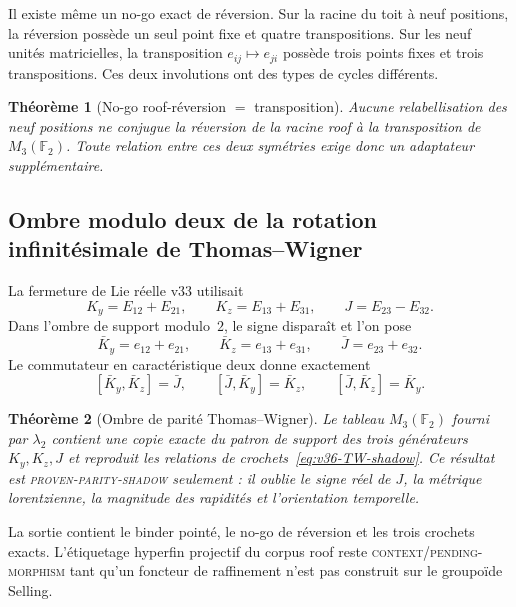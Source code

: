 \documentclass[11pt,a4paper]{article}
\newtheorem{theorem}{Théorème}[section]
\begin{document}
Il existe même un no-go exact de réversion. Sur la racine du toit à neuf positions, la réversion possède un seul point fixe et quatre transpositions. Sur les neuf unités matricielles, la transposition $e_{ij}\mapsto e_{ji}$ possède trois points fixes et trois transpositions. Ces deux involutions ont des types de cycles différents.

\begin{theorem}[No-go roof-réversion $=$ transposition]\label{thm:v36-roof-transpose-nogo}
Aucune relabellisation des neuf positions ne conjugue la réversion de la racine roof à la transposition de $M_3(\mathbb F_2)$. Toute relation entre ces deux symétries exige donc un adaptateur supplémentaire.
\end{theorem}

\subsection{Ombre modulo deux de la rotation infinitésimale de Thomas--Wigner}

La fermeture de Lie réelle v33 utilisait
\[
K_y=E_{12}+E_{21},\qquad
K_z=E_{13}+E_{31},\qquad
J=E_{23}-E_{32}.
\]
Dans l'ombre de support modulo~$2$, le signe disparaît et l'on pose
\[
\bar K_y=e_{12}+e_{21},\qquad
\bar K_z=e_{13}+e_{31},\qquad
\bar J=e_{23}+e_{32}.
\]
Le commutateur en caractéristique deux donne exactement
\begin{equation}\label{eq:v36-TW-shadow}
\boxed{
[\bar K_y,\bar K_z]=\bar J,
\qquad
[\bar J,\bar K_y]=\bar K_z,
\qquad
[\bar J,\bar K_z]=\bar K_y.
}
\end{equation}

\begin{theorem}[Ombre de parité Thomas--Wigner]\label{thm:v36-TW-parity-shadow}
Le tableau $M_3(\mathbb F_2)$ fourni par $\lambda_2$ contient une copie exacte du patron de support des trois générateurs $K_y,K_z,J$ et reproduit les relations de crochets~\eqref{eq:v36-TW-shadow}. Ce résultat est \textsc{proven-parity-shadow} seulement : il oublie le signe réel de $J$, la métrique lorentzienne, la magnitude des rapidités et l'orientation temporelle.
\end{theorem}

La sortie  contient le binder pointé, le no-go de réversion et les trois crochets exacts. L'étiquetage hyperfin projectif du corpus roof reste \textsc{context/pending-morphism} tant qu'un foncteur de raffinement n'est pas construit sur le groupoïde Selling.
\end{document}
